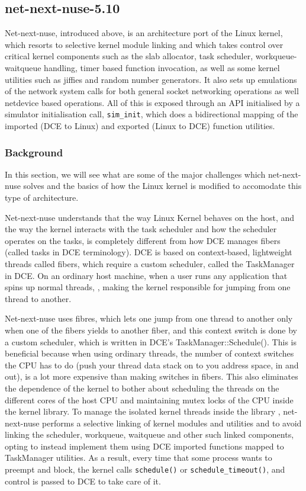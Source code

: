 \documentclass{sig-alternate}
\begin{document}
\subsection{net-next-nuse-5.10}
Net-next-nuse, introduced above, is an architecture port of the Linux kernel, which resorts to selective kernel module linking and which takes control over critical kernel 
components such as the slab allocator, task scheduler, workqueue-waitqueue handling, timer based function invocation, as well as some kernel 
utilities such as jiffies and random number generators. It also sets up emulations of the network system calls for both general socket networking 
operations as well netdevice based operations. All of this is exposed through an API initialised by a simulator initialisation call, \texttt{sim\_init}, 
which does a bidirectional mapping of the imported (DCE to Linux) and exported (Linux to DCE) function utilities.

\subsubsection{Background}
In this section, we will see what are some of the major challenges which net-next-nuse solves and the basics of how the Linux kernel is modified to 
accomodate this type of architecture.

Net-next-nuse understands that the way Linux Kernel behaves on the host, and the way the kernel interacts with the task 
scheduler and how the scheduler operates on the tasks, is completely different from how DCE manages fibers (called tasks in DCE terminology). 
DCE is based on context-based, lightweight threads called fibers, which require a custom scheduler, called the TaskManager in DCE. On an ordinary
host machine, when a user runs any application that spins up normal threads, , making the kernel responsible for jumping from one thread to another. 

Net-next-nuse uses fibres, which lets one jump from one thread to another only when one of the fibers yields to another fiber, and this context switch 
is done by a custom scheduler, which is written in DCE's TaskManager::Schedule(). This is beneficial because when using ordinary threads, 
the number of context switches the CPU has to do (push your thread data stack on to you address space, in and out), 
is a lot more expensive than making switches in fibers. This also eliminates the dependence of the kernel to bother about scheduling the threads on 
the different cores of the host CPU and maintaining mutex locks of the CPU inside the kernel library. To manage the isolated kernel threads inside the library , 
net-next-nuse  performs  a selective linking of 
kernel modules and utilities and to avoid linking the scheduler, workqueue, waitqueue and other such linked components, opting to instead implement
them using DCE imported functions mapped to TaskManager utilities. As a result, every time that some process wants to preempt and block, the kernel calls 
\texttt{schedule()} or \texttt{schedule\_timeout()}, and control is passed to DCE to take care of it. 
\end{document}
